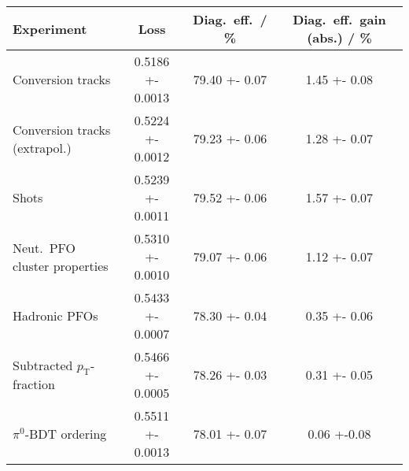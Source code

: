 \begin{tabular}{p{5cm}S[table-format=1.4(4)]S[table-format=2.2(2)]S[table-format=1.2(2)]}
  \toprule
  {Experiment} & {Loss} & {Diag.\ eff.\ / \si{\percent}} & {Diag.\ eff.\ gain (abs.) / \si{\percent}} \\
  \midrule
  Conversion tracks & 0.5186 +- 0.0013 & 79.40 +- 0.07 & 1.45 +- 0.08 \\
  Conversion tracks (extrapol.) & 0.5224 +- 0.0012 & 79.23 +- 0.06 & 1.28 +- 0.07 \\
  Shots & 0.5239 +- 0.0011 & 79.52 +- 0.06 &  1.57 +- 0.07 \\
  Neut.\ PFO cluster properties & 0.5310 +- 0.0010 & 79.07 +- 0.06 & 1.12 +- 0.07 \\
  Hadronic PFOs & 0.5433 +- 0.0007 & 78.30 +- 0.04 & 0.35 +- 0.06 \\
  Subtracted $p_\text{T}$-fraction & 0.5466 +- 0.0005 & 78.26 +- 0.03 & 0.31 +- 0.05 \\
  $\pi^0$-BDT ordering & 0.5511 +- 0.0013 & 78.01 +- 0.07 & 0.06 +-0.08 \\
  \bottomrule
\end{tabular}

